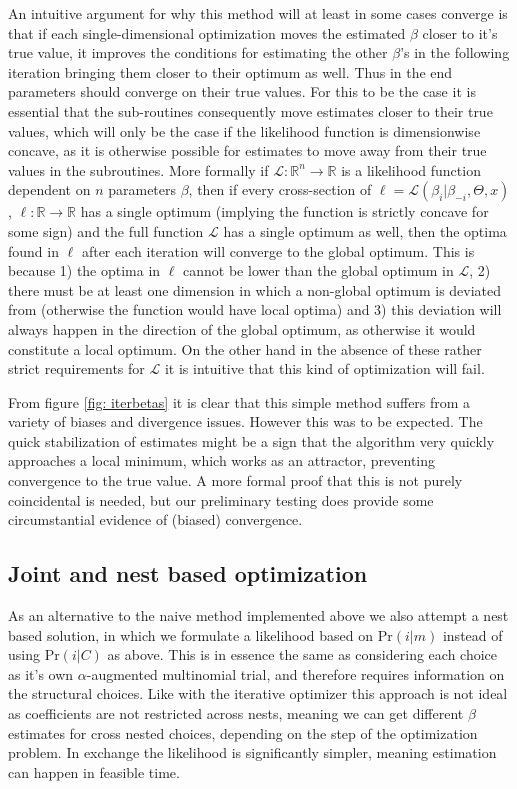 An intuitive argument for why this method will at least in some cases converge is that if each single-dimensional optimization moves the estimated $\beta$ closer to it's true value, it improves the conditions for estimating the other $\beta$'s in the following iteration bringing them closer to their optimum as well. Thus in the end parameters should converge on their true values. For this to be the case it is essential that the sub-routines consequently move estimates closer to their true values, which will only be the case if the likelihood function is dimensionwise concave, as it is otherwise possible for estimates to move away from their true values in the subroutines. More formally if $\mathcal{L} : \mathbb{R}^n \rightarrow \mathbb{R}$ is a likelihood function dependent on $n$ parameters $\beta$, then if every cross-section of $\ell = \mathcal{L}(\beta_i | \beta_{-i}, \Theta, x)$, $\ell : \mathbb{R} \rightarrow \mathbb{R}$  has a single optimum (implying the function is strictly concave for some sign) and the full function $\mathcal{L}$ has a single optimum as well, then the optima found in $\ell$ after each iteration will converge to the global optimum. This is because 1) the optima in $\ell$ cannot be lower than the global optimum in $\mathcal{L}$, 2) there must be at least one dimension in which a non-global optimum is deviated from (otherwise the function would have local optima) and 3) this deviation will always happen in the direction of the global optimum, as otherwise it would constitute a local optimum. On the other hand in the absence of these rather strict requirements for $\mathcal{L}$ it is intuitive that this kind of optimization will fail.

From figure \ref{fig: iterbetas} it is clear that this simple method suffers from a variety of biases and divergence issues. However this was to be expected. The quick stabilization of estimates might be a sign that the algorithm very quickly approaches a local minimum, which works as an attractor, preventing convergence to the true value. A more formal proof that this is not purely coincidental is needed, but our preliminary testing does provide some circumstantial evidence of (biased) convergence.


\subsection{Joint and nest based optimization}
As an alternative to the naive method implemented above we also attempt a nest based solution, in which we formulate a likelihood based on $\textrm{Pr}(i|m)$ instead of using $\textrm{Pr}(i|C)$ as above. This is in essence the same as considering each choice as it's own $\alpha$-augmented multinomial trial, and therefore requires information on the structural choices. Like with the iterative optimizer this approach is not ideal as coefficients are not restricted across nests, meaning we can get different $\beta$ estimates for cross nested choices, depending on the step of the optimization problem. In exchange the likelihood is significantly simpler, meaning estimation can happen in feasible time.

